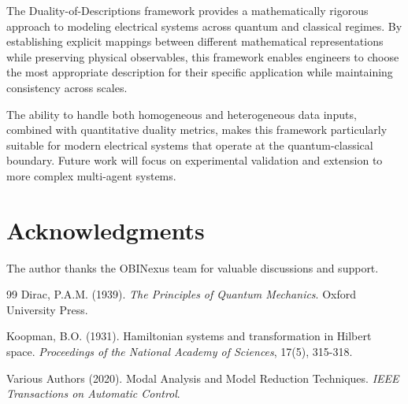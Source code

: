 \documentclass[11pt,a4paper]{article}
\begin{document}
The Duality-of-Descriptions framework provides a mathematically rigorous approach to modeling electrical systems across quantum and classical regimes. By establishing explicit mappings between different mathematical representations while preserving physical observables, this framework enables engineers to choose the most appropriate description for their specific application while maintaining consistency across scales.

The ability to handle both homogeneous and heterogeneous data inputs, combined with quantitative duality metrics, makes this framework particularly suitable for modern electrical systems that operate at the quantum-classical boundary. Future work will focus on experimental validation and extension to more complex multi-agent systems.

\section*{Acknowledgments}
The author thanks the OBINexus team for valuable discussions and support.

\begin{thebibliography}{99}
 Dirac, P.A.M. (1939). \textit{The Principles of Quantum Mechanics}. Oxford University Press.

 Koopman, B.O. (1931). Hamiltonian systems and transformation in Hilbert space. \textit{Proceedings of the National Academy of Sciences}, 17(5), 315-318.

 Various Authors (2020). Modal Analysis and Model Reduction Techniques. \textit{IEEE Transactions on Automatic Control}.
\end{thebibliography}
\end{document}
